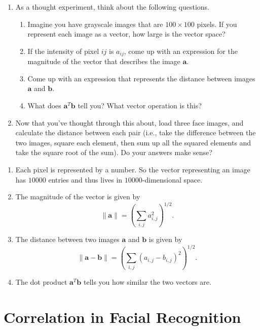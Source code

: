 \begin{prob}
\begin{enumerate}
\item As a thought experiment, think about the following questions.
\begin{enumerate}
\item Imagine you have grayscale images that are $100 \times 100$ pixels.  If you represent each image as a vector, how large is the vector space?
\item If the intensity of pixel $ij$ is $a_{ij}$, come up with an expression for the magnitude of the vector that describes the image $\mathbf{a}$.
\item Come up with an expression that represents the distance between images $\mathbf{a}$ and $\mathbf{b}$.
\item What does $\mathbf{a}^T\mathbf{b}$ tell you?  What vector operation is this?

    \end{enumerate}
\item Now that you've thought through this about, load three face images, and calculate the distance between each pair (i.e., take the difference between the two images, square each element, then sum up all the squared elements and take the square root of the sum).  Do your answers make sense?
\end{enumerate}
\end{prob}
\begin{sol}
\begin{enumerate}
    \item Each pixel is represented by a number. So the vector representing an image has $10000$ entries and thus lives in $10000$-dimensional space.
    \item The magnitude of the vector is given by
    $$\|\mathbf{a}\| = \left(\sum_{i,j} a_{i,j}^2\right)^{1/2}.$$
    \item The distance between two images $\mathbf{a}$ and $\mathbf{b}$ is given by
    $$\|\mathbf{a}-\mathbf{b}\| = \left(\sum_{i,j} (a_{i,j}-b_{i,j})^2\right)^{1/2}.$$
    \item The dot product $\mathbf{a}^T\mathbf{b}$ tells you how similar the two vectors are.
\end{enumerate}
\end{sol}

\section{Correlation in Facial Recognition}

